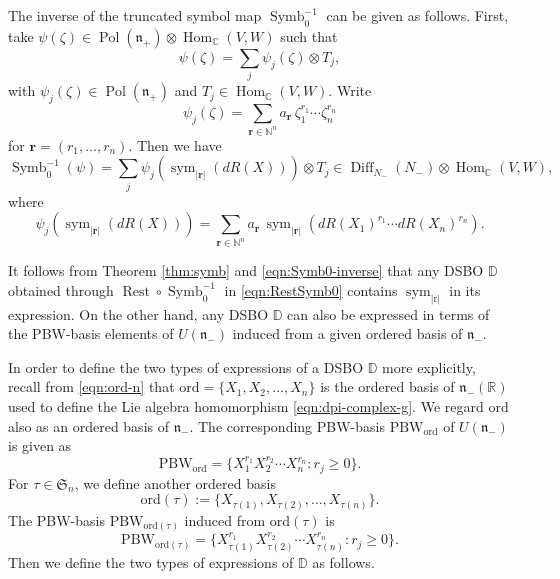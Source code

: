\documentclass[a4paper,11pt,reqno]{amsart}
\newcommand{\frakn}{\mathfrak{n}}
\newcommand{\DD}{\mathbb{D}}
\newcommand{\NN}{\mathbb{N}}
\newcommand{\0}{{\bf 0}}
\newcommand{\R}{\mathbb{R}}
\newcommand{\C}{\mathbb{C}}
\newcommand{\1}{{\bf 1}}
\DeclareMathOperator{\Hom}{Hom}
\DeclareMathOperator{\Pol}{Pol}
\newcommand{\ord}{{\mathrm{ord}}}
\DeclareMathOperator{\Diff}{Diff}
\DeclareMathOperator{\Symb}{Symb}
\DeclareMathOperator{\Rest}{Rest}
\DeclareMathOperator{\sym}{sym}
\theoremstyle{plain}
\theoremstyle{definition}
\numberwithin{equation}{section}
\theoremstyle{definition}
\begin{document}
The inverse of the truncated symbol map $\Symb_0^{-1}$ can be given as follows.
First, take $\psi(\zeta) \in  \Pol(\frakn_+)\otimes \Hom_\C(V,W)$ such that
\begin{equation*}
\psi(\zeta)=\sum_{j}\psi_{j}(\zeta) \otimes T_j,
\end{equation*}
with $\psi_{j}(\zeta) \in \Pol(\frakn_+)$ and $T_j \in \Hom_\C(V,W)$.
Write
\begin{equation*}
\psi_{j}(\zeta)=\sum_{\mathbf{r} \in \NN^n}a_\mathbf{r} \, 
\zeta_1^{r_1}\cdots \zeta_n^{r_n}
\end{equation*}
for $\mathbf{r} = (r_1, \ldots, r_n)$. 
Then we have
\begin{equation}\label{eqn:Symb0-inverse}
\Symb_0^{-1}(\psi)=\sum_{j}\psi_{j}(\sym_{|\mathbf{r}|}(dR(X))) \otimes T_j
\in \Diff_{N_-}(N_-)\otimes \Hom_\C(V,W),
\end{equation}
where
\begin{equation*}
\psi_{j}(\sym_{|\mathbf{r}|}(dR(X)))
=\sum_{\mathbf{r} \in \NN^n}a_\mathbf{r}\, 
\sym_{|\mathbf{r}|}(dR(X_1)^{r_1}\cdots dR(X_n)^{r_n}).
\end{equation*}

It follows from 
Theorem \ref{thm:symb} and \eqref{eqn:Symb0-inverse} that
any DSBO $\mathbb{D}$ obtained 
through $\Rest \circ \Symb_0^{-1}$
in \eqref{eqn:RestSymb0} contains $\sym_{|\mathrm{r}|}$
in its expression. On the other hand, any DSBO $\mathbb{D}$ can also be expressed 
in terms of the PBW-basis elements of $U(\frakn_-)$ 
induced from a given ordered basis of $\frakn_-$.

In order to define the two types of expressions of a DSBO $\DD$
more explicitly,
recall from \eqref{eqn:ord-n}
that $\ord=\{X_1, X_2, \ldots, X_n\}$ is the ordered basis 
of $\frakn_-(\R)$ used to define 
the Lie algebra homomorphism \eqref{eqn:dpi-complex-g}. 
We regard $\ord$ also as an ordered basis of 
$\frakn_-$.
The corresponding PBW-basis $\mathrm{PBW}_\ord$ of $U(\frakn_-)$ is given as
\begin{equation}\label{eqn:PBW}
\mathrm{PBW}_\ord =\{X_1^{r_1}X_2^{r_2}\cdots X_n^{r_n}: r_j\geq 0\}.
\end{equation}
For $\tau \in \mathfrak{S}_n$, 
we define another ordered basis
\begin{equation}\label{eqn:ord-tau}
\ord(\tau):=\{X_{\tau(1)}, X_{\tau(2)},\ldots, X_{\tau(n)}\}.
\end{equation}
The PBW-basis $\mathrm{PBW}_{\ord(\tau)}$ induced from
$\ord(\tau)$ is
\begin{equation*}
\mathrm{PBW}_{\ord(\tau)} =\{X_{\tau(1)}^{r_1}X_{\tau(2)}^{r_2}\cdots 
X_{\tau(n)}^{r_n}: r_j\geq 0\}.
\end{equation*}
Then we define the two types of expressions of $\DD$ as follows.
\end{document}
